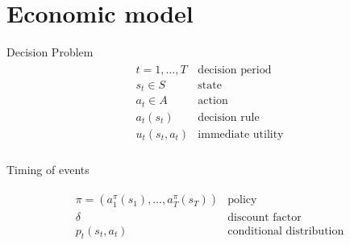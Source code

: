 \section{Economic model}
\begin{frame}{Decision Problem}
\begin{align*}\begin{array}{ll}
t = 1, \hdots, T& \text{decision period} \\[0.5em]
s_t\in S & \text{state}  \\[0.5em]
a_t\in A & \text{action} \\[0.5em]
a_t(s_t) & \text{decision rule} \\[0.5em]
u_t(s_t, a_t) & \text{immediate utility}\\[0.5em]
\end{array}\end{align*}
\end{frame}
\begin{frame}{Timing of events}
\vspace{1.5cm}
\scalebox{0.9}{\hspace{-0.2cm}}
\end{frame}
\begin{frame}{}\vspace{2.0cm}
\begin{align*}\begin{array}{ll}
\pi = (a^\pi_1(s_1), \hdots, a^\pi_T(s_T)) & \text{policy}\\[0.5em]
\delta & \text{discount factor} \\[0.5em]
p_t(s_t, a_t) & \text{conditional distribution}
\end{array}\end{align*}
\end{frame}
